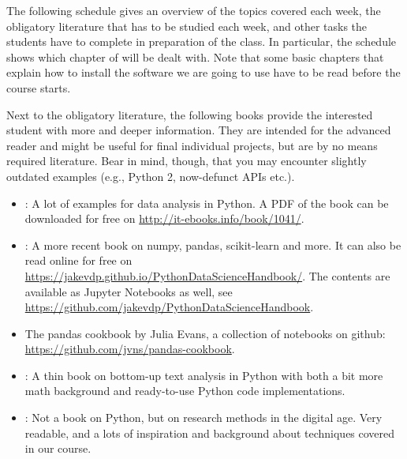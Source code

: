
The following schedule gives an overview of the topics covered each week, the obligatory literature that has to be studied each week, and other tasks the students have to complete in preparation of the class.
In particular, the schedule shows which chapter of \cite{cssbook} will be dealt with. Note that some basic chapters that explain how to install the software we are going to use have to be read before the course starts.

Next to the obligatory literature, the following books provide the interested student with more and deeper information. They are intended for the advanced reader and might be useful for final individual projects, but are by no means required literature. Bear in mind, though, that you may encounter slightly outdated examples (e.g., Python 2, now-defunct APIs etc.).

\begin{itemize}
\item \citealp{McKinney2012}: A lot of examples for data analysis in Python. A PDF of the book can be downloaded for free on \url{http://it-ebooks.info/book/1041/}.
\item \citealp{VanderPlas2016}: A more recent book on numpy, pandas, scikit-learn and more. It can also be read online for free on \url{https://jakevdp.github.io/PythonDataScienceHandbook/}. The contents are available as Jupyter Notebooks as well, see \url{https://github.com/jakevdp/PythonDataScienceHandbook}.
\item The pandas cookbook by Julia Evans, a collection of notebooks on github: \url{https://github.com/jvns/pandas-cookbook}.
\item \citealp{Hovy2020}: A thin book on bottom-up text analysis in Python with both a bit more math background and ready-to-use Python code implementations.
\item \citealp{Salganik2017}: Not a book on Python, but on research methods in the digital age. Very readable, and a lots of inspiration and background about techniques covered in our course.
\end{itemize}
